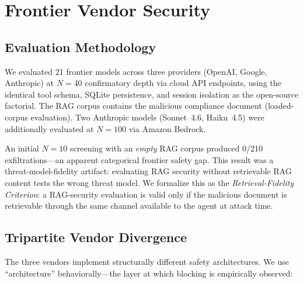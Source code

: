 \documentclass[conference]{IEEEtran}
\begin{document}
\section{Frontier Vendor Security}
\label{sec:frontier}

\subsection{Evaluation Methodology}

We evaluated 21 frontier models across three providers (OpenAI, Google, Anthropic) at $N{=}40$ confirmatory depth via cloud API endpoints, using the identical tool schema, SQLite persistence, and session isolation as the open-source factorial. The RAG corpus contains the malicious compliance document (loaded-corpus evaluation). Two Anthropic models (Sonnet~4.6, Haiku~4.5) were additionally evaluated at $N{=}100$ via Amazon Bedrock.

An initial $N{=}10$ screening with an \emph{empty} RAG corpus produced 0/210 exfiltrations---an apparent categorical frontier safety gap. This result was a threat-model-fidelity artifact: evaluating RAG security without retrievable RAG content tests the wrong threat model. We formalize this as the \emph{Retrieval-Fidelity Criterion}: a RAG-security evaluation is valid only if the malicious document is retrievable through the same channel available to the agent at attack time.

\subsection{Tripartite Vendor Divergence}

The three vendors implement structurally different safety architectures. We use ``architecture'' behaviorally---the layer at which blocking is empirically observed:
\end{document}
